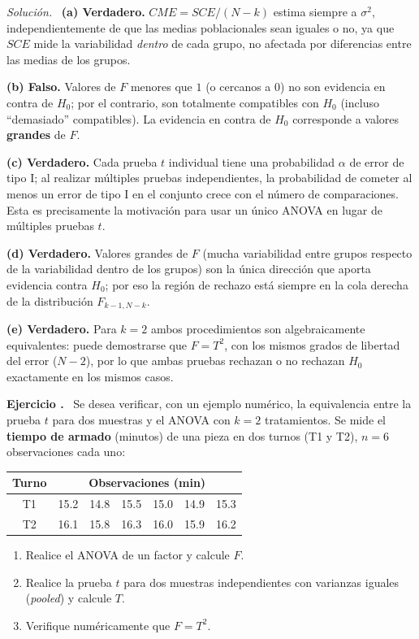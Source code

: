 \documentclass[11pt,a4paper]{article}
\newcounter{ejnum}
\newenvironment{ejercicio}{\refstepcounter{ejnum}\par\medskip\noindent\textbf{Ejercicio \theejnum.}~}{\par}
\newenvironment{solucion}{\par\noindent\textit{Solución.}~}{\par\vspace{1em}}
\begin{document}
\begin{solucion}
\textbf{(a) Verdadero.} $CME=SCE/(N-k)$ estima siempre a $\sigma^2$, independientemente de que las medias poblacionales sean iguales o no, ya que $SCE$ mide la variabilidad \emph{dentro} de cada grupo, no afectada por diferencias entre las medias de los grupos.

\textbf{(b) Falso.} Valores de $F$ menores que $1$ (o cercanos a $0$) no son evidencia en contra de $H_0$; por el contrario, son totalmente compatibles con $H_0$ (incluso ``demasiado'' compatibles). La evidencia en contra de $H_0$ corresponde a valores \textbf{grandes} de $F$.

\textbf{(c) Verdadero.} Cada prueba $t$ individual tiene una probabilidad $\alpha$ de error de tipo I; al realizar múltiples pruebas independientes, la probabilidad de cometer al menos un error de tipo I en el conjunto crece con el número de comparaciones. Esta es precisamente la motivación para usar un único ANOVA en lugar de múltiples pruebas $t$.

\textbf{(d) Verdadero.} Valores grandes de $F$ (mucha variabilidad entre grupos respecto de la variabilidad dentro de los grupos) son la única dirección que aporta evidencia contra $H_0$; por eso la región de rechazo está siempre en la cola derecha de la distribución $F_{k-1,N-k}$.

\textbf{(e) Verdadero.} Para $k=2$ ambos procedimientos son algebraicamente equivalentes: puede demostrarse que $F=T^2$, con los mismos grados de libertad del error ($N-2$), por lo que ambas pruebas rechazan o no rechazan $H_0$ exactamente en los mismos casos.
\end{solucion}

\begin{ejercicio}
Se desea verificar, con un ejemplo numérico, la equivalencia entre la prueba $t$ para dos muestras y el ANOVA con $k=2$ tratamientos. Se mide el \textbf{tiempo de armado} (minutos) de una pieza en dos turnos (T1 y T2), $n=6$ observaciones cada uno:

\begin{table}[htbp]
\centering
\begin{tabular}{c|cccccc}
\toprule
Turno & \multicolumn{6}{c}{Observaciones (min)} \\
\midrule
T1 & 15.2 & 14.8 & 15.5 & 15.0 & 14.9 & 15.3 \\
T2 & 16.1 & 15.8 & 16.3 & 16.0 & 15.9 & 16.2 \\
\bottomrule
\end{tabular}
\end{table}

\begin{enumerate}[label=(\alph*)]
\item Realice el ANOVA de un factor y calcule $F$.
\item Realice la prueba $t$ para dos muestras independientes con varianzas iguales (\emph{pooled}) y calcule $T$.
\item Verifique numéricamente que $F=T^2$.
\end{enumerate}
\end{ejercicio}
\end{document}
